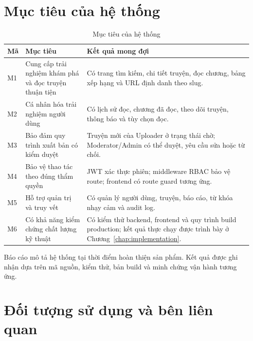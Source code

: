 \section{Mục tiêu của hệ thống}

\begin{table}[htbp]
\centering
\caption{Mục tiêu của hệ thống}
\label{tab:system-objectives}
\begin{tabularx}{\textwidth}{|>{\centering\arraybackslash}p{1.2cm}|>{\RaggedRight\arraybackslash}p{5.2cm}|X|}
\hline
\textbf{Mã} & \textbf{Mục tiêu} & \textbf{Kết quả mong đợi} \\
\hline
M1 & Cung cấp trải nghiệm khám phá và đọc truyện thuận tiện & Có trang tìm kiếm, chi tiết truyện, đọc chương, bảng xếp hạng và URL định danh theo slug. \\
\hline
M2 & Cá nhân hóa trải nghiệm người dùng & Có lịch sử đọc, chương đã đọc, theo dõi truyện, thông báo và tùy chọn đọc. \\
\hline
M3 & Bảo đảm quy trình xuất bản có kiểm duyệt & Truyện mới của Uploader ở trạng thái chờ; Moderator/Admin có thể duyệt, yêu cầu sửa hoặc từ chối. \\
\hline
M4 & Bảo vệ thao tác theo đúng thẩm quyền & JWT xác thực phiên; middleware RBAC bảo vệ route; frontend có route guard tương ứng. \\
\hline
M5 & Hỗ trợ quản trị và truy vết & Có quản lý người dùng, truyện, báo cáo, từ khóa nhạy cảm và audit log. \\
\hline
M6 & Có khả năng kiểm chứng chất lượng kỹ thuật & Có kiểm thử backend, frontend và quy trình build production; kết quả thực chạy được trình bày ở Chương~\ref{chap:implementation}. \\
\hline
\end{tabularx}
\end{table}

Báo cáo mô tả hệ thống tại thời điểm hoàn thiện sản phẩm. Kết quả được ghi nhận dựa trên mã nguồn, kiểm thử, bản build và minh chứng vận hành tương ứng.

\clearpage
\section{Đối tượng sử dụng và bên liên quan}

